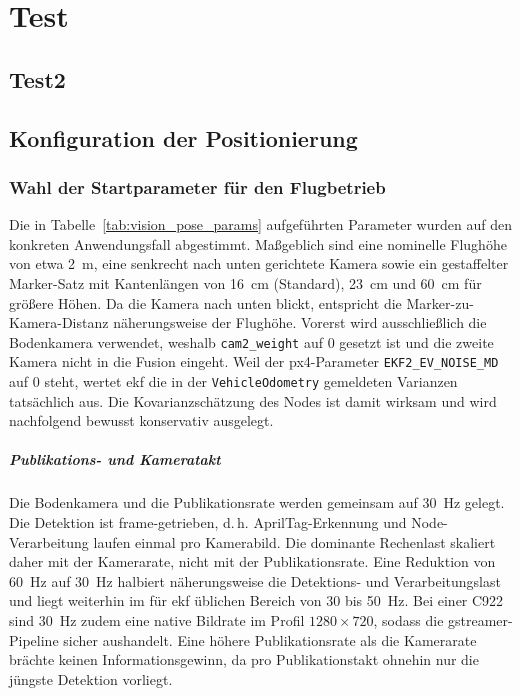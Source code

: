 
\chapter{Test}

\section{Test2}
\section{Konfiguration der Positionierung}
\subsection{Wahl der Startparameter für den Flugbetrieb}
\label{subsec:pos_parametrierung}

Die in Tabelle~\ref{tab:vision_pose_params} aufgeführten Parameter wurden auf den konkreten Anwendungsfall abgestimmt.
Maßgeblich sind eine nominelle Flughöhe von etwa 2~m, eine senkrecht nach unten gerichtete Kamera sowie ein gestaffelter Marker-Satz mit Kantenlängen von 16~cm (Standard), 23~cm und 60~cm für größere Höhen.
Da die Kamera nach unten blickt, entspricht die Marker-zu-Kamera-Distanz näherungsweise der Flughöhe.
Vorerst wird ausschließlich die Bodenkamera verwendet, weshalb \texttt{cam2\_weight} auf $0$ gesetzt ist und die zweite Kamera nicht in die Fusion eingeht.
Weil der \gls{px4}-Parameter \texttt{EKF2\_EV\_NOISE\_MD} auf $0$ steht, wertet \gls{ekf} die in der \texttt{VehicleOdometry} gemeldeten Varianzen tatsächlich aus.
Die Kovarianzschätzung des Nodes ist damit wirksam und wird nachfolgend bewusst konservativ ausgelegt.

\paragraph{Publikations- und Kameratakt}
Die Bodenkamera und die Publikationsrate werden gemeinsam auf 30~Hz gelegt.
Die Detektion ist frame-getrieben, d.\,h. AprilTag-Erkennung und Node-Verarbeitung laufen einmal pro Kamerabild.
Die dominante Rechenlast skaliert daher mit der Kamerarate, nicht mit der Publikationsrate.
Eine Reduktion von 60~Hz auf 30~Hz halbiert näherungsweise die Detektions- und Verarbeitungslast und liegt weiterhin im für \gls{ekf} üblichen Bereich von 30 bis 50~Hz.
Bei einer C922 sind 30~Hz zudem eine native Bildrate im Profil $1280\times720$, sodass die gstreamer-Pipeline sicher aushandelt.
Eine höhere Publikationsrate als die Kamerarate brächte keinen Informationsgewinn, da pro Publikationstakt ohnehin nur die jüngste Detektion vorliegt.

